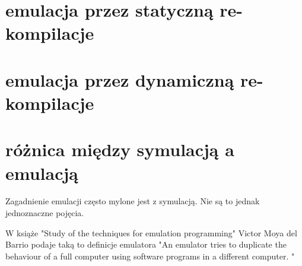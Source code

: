 	\section{emulacja przez statyczną re-kompilacje}
	\section{emulacja przez dynamiczną re-kompilacje}
	
	\section{różnica między symulacją a emulacją} 
	Zagadnienie emulacji często mylone jest z symulacją. Nie są to jednak jednoznaczne pojęcia.
	
	W książe "Study of the techniques for emulation
	programming" Victor Moya del Barrio podaje taką to definicje emulatora "An emulator tries to duplicate the behaviour of a full computer using software programs in a different computer. "\cite{studyofthetechniquesforemulationprogramming}